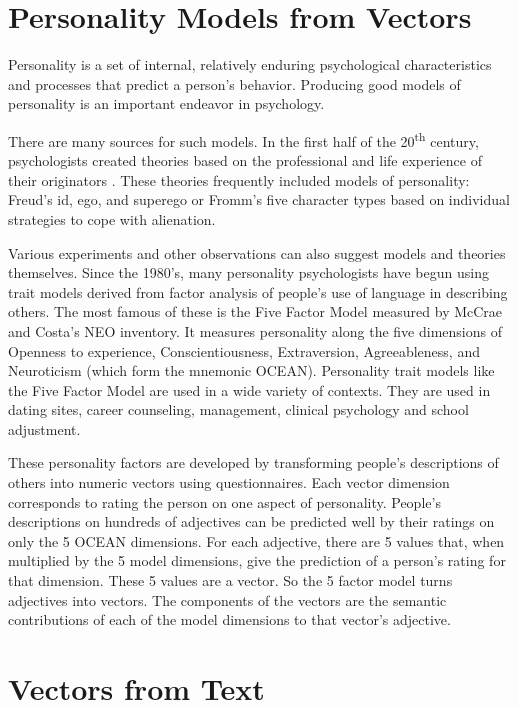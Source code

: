\section{Personality Models from Vectors}
\label{sec:personalitymodelsfromvectors}
Personality is a set of internal, relatively enduring psychological 
characteristics and processes that predict a person's behavior. Producing good
models of personality is an important endeavor in psychology.

There are many sources for such models. In the first half of the
20\textsuperscript{th} century, psychologists created theories based
on the professional and life experience of their originators . These theories frequently included models of
personality: Freud's id, ego, and superego or Fromm's five character
types based on individual strategies to cope with alienation.

Various experiments and other observations can also suggest models and
theories themselves. Since the 1980's, many personality psychologists
have begun using trait models derived from factor analysis of people's
use of language in describing others. The most famous of these is
the Five Factor Model measured by McCrae and Costa's NEO inventory. It
measures personality along the five dimensions of Openness to
experience, Conscientiousness, Extraversion, Agreeableness, and
Neuroticism (which form the mnemonic OCEAN). Personality trait models
like the Five Factor Model are used in a wide variety of contexts.
They are used in dating sites, career counseling, management, clinical
psychology and school adjustment.

These personality factors are developed by transforming people's
descriptions of others into numeric vectors using questionnaires. Each
vector dimension corresponds to rating the person on one aspect of
personality. People's descriptions on hundreds of adjectives can be
predicted well by their ratings on only the 5 OCEAN dimensions. For
each adjective, there are 5 values that, when multiplied by the 5
model dimensions, give the prediction of a person's rating for that
dimension.  These 5 values are a vector. So the 5 factor model turns
adjectives into vectors. The components of the vectors are the
semantic contributions of each of the model dimensions to that
vector's adjective.

\section{Vectors from Text}

